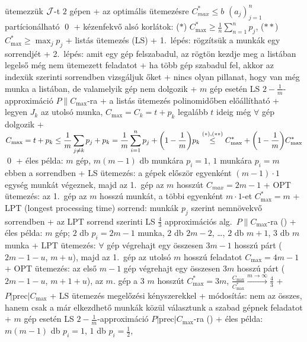       ütemezzük $\mathcal{J}$-t $2$ gépen
      + az optimális ütemezésre $C_{max}^* \le b$ \LRA $(a_j)_{j = 1}^n$
        partícionálható \qed
  + kézenfekvő alsó korlátok: ($*$) $C_{\max}^* \ge \frac{1}{n} \sum_{n =
    1}^n p_j$, ($**$) $C_{\max}^* \ge \max_{j} p_j$
  + \alg listás ütemezés (LS)
    + 1.~lépés: rögzítsük a munkák egy sorrendjét
    + 2.~lépés: amit egy gép felszabadul, az rögtön kezdje meg a
      listában legelső még nem ütemezett feladatot
      + ha több gép szabadul fel, akkor az indexük szerinti sorrendben
        vizsgáljuk őket
    + nincs olyan pillanat, hogy van még munka a listában, de valamelyik gép
      nem dolgozik
  + \thm $m$ gép esetén LS $2 - \frac{1}{m}$-approximáció
    $P\|C_{\max}$-ra
    + \proof a listás ütemezés polinomidőben előállítható
    + legyen $J_k$ az utolsó munka, $C_{\max} = C_k = t + p_k$ \RA%
      legalább $t$ ideig még $\forall$ gép dolgozik
    + $\displaystyle C_{\max} = t + p_k \le \frac{1}{m} \sum_{j \ne k}
      p_j + p_k = \frac{1}{m} \sum_{i = 1}^n p_j + \mleft(1 -
      \frac{1}{m}\mright) p_k \overset{(*), (**)}{\le} C^*_{\max} +
      \mleft(1 - \frac{1}{m}\mright) C^*_{\max}$ \qed
  + éles példa: $m$ gép, $m (m - 1)$ db munkára $p_i = 1$, $1$
    munkára $p_i = m$ ebben a sorrendben
    + LS ütemezés: a gépek először egyenként $(m - 1) \cdot 1$ egység
      munkát végeznek, majd az 1.~gép az $m$ hosszút \RA $C_{max} = 2m
      - 1$
    + OPT ütemezés: az 1.~gép az $m$ hosszú munkát, a többi egyenként
      $m \cdot 1$-et \RA $C_{\max}^* = m$
  + LPT (longest processing time) sorrend: munkák $p_j$ szerint
    nemnövekvő sorrendben
  + \thm az LPT sorrend szerinti LS $\frac{4}{3}$ approximációs
    alg.~$P\|C_{\max}$-ra (\noproof)
  + éles példa: $m$ gép; $2$ db $p_i = 2m - 1$ munka, $2$ db $2m - 2$,
    \ldots, $2$ db $m + 1$, $3$ db $m$ munka
    + LPT ütemezés: $\forall$ gép végrehajt egy összesen $3m - 1$
      hosszú párt ($2m - 1 - u$, $m + u$), majd az 1.~gép az utolsó $m$
      hosszú feladatot \RA $C_{\max} = 4m - 1$
    + OPT ütemezés: az első $m - 1$ gép végrehajt egy összesen $3m$
      hosszú párt ($2m - 1 - u$, $m + 1 + u$), az $m$. gép a 3 $m$
      hosszút \RA $C_{\max}^* = 3m$, $\frac{C_{\max}}{C_{\max}^*}
      \xrightarrow{m \to \infty} \frac{4}{3}$
+ \prob $P|\textrm{prec}|C_{\max}$
  + \alg LS ütemezés megelőzési kényszerekkel
    + módosítás: nem az összes, hanem csak a már elkezdhető munkák
      közül választunk a szabad gépnek feladatot
  + \thm $m$ gép esetén LS $2 - \frac{1}{m}$-approximáció
    $P|\textrm{prec}|C_{\max}$-ra (\noproof)
  + éles példa: $m (m - 1)$ db $p_i = 1$, $1$ db $p_i = \frac{1}{2}$,

